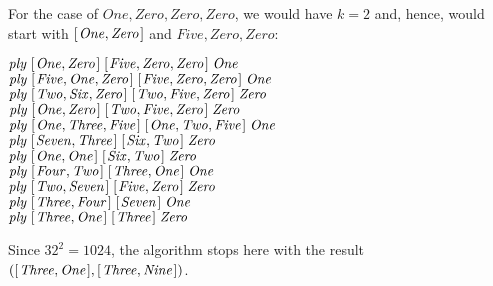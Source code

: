 \documentclass{scrreprt}
\newcommand{\Conid}[1]{\mathit{#1}}
\newcommand{\Varid}[1]{\mathit{#1}}
\begin{document}
For the case of \ensuremath{\Conid{One},\Conid{Zero},\Conid{Zero},\Conid{Zero}},
we would have $k = 2$ and, hence, would start
with \ensuremath{[\mskip1.5mu \Conid{One},\Conid{Zero}\mskip1.5mu]} and \ensuremath{\Conid{Five},\Conid{Zero},\Conid{Zero}}:

\ensuremath{\Varid{ply}\;[\mskip1.5mu \Conid{One},\Conid{Zero}\mskip1.5mu]\;[\mskip1.5mu \Conid{Five},\Conid{Zero},\Conid{Zero}\mskip1.5mu]\;\Conid{One}}\\
\ensuremath{\Varid{ply}\;[\mskip1.5mu \Conid{Five},\Conid{One},\Conid{Zero}\mskip1.5mu]\;[\mskip1.5mu \Conid{Five},\Conid{Zero},\Conid{Zero}\mskip1.5mu]\;\Conid{One}}\\
\ensuremath{\Varid{ply}\;[\mskip1.5mu \Conid{Two},\Conid{Six},\Conid{Zero}\mskip1.5mu]\;[\mskip1.5mu \Conid{Two},\Conid{Five},\Conid{Zero}\mskip1.5mu]\;\Conid{Zero}}\\
\ensuremath{\Varid{ply}\;[\mskip1.5mu \Conid{One},\Conid{Zero}\mskip1.5mu]\;[\mskip1.5mu \Conid{Two},\Conid{Five},\Conid{Zero}\mskip1.5mu]\;\Conid{Zero}}\\
\ensuremath{\Varid{ply}\;[\mskip1.5mu \Conid{One},\Conid{Three},\Conid{Five}\mskip1.5mu]\;[\mskip1.5mu \Conid{One},\Conid{Two},\Conid{Five}\mskip1.5mu]\;\Conid{One}}\\
\ensuremath{\Varid{ply}\;[\mskip1.5mu \Conid{Seven},\Conid{Three}\mskip1.5mu]\;[\mskip1.5mu \Conid{Six},\Conid{Two}\mskip1.5mu]\;\Conid{Zero}}\\
\ensuremath{\Varid{ply}\;[\mskip1.5mu \Conid{One},\Conid{One}\mskip1.5mu]\;[\mskip1.5mu \Conid{Six},\Conid{Two}\mskip1.5mu]\;\Conid{Zero}}\\
\ensuremath{\Varid{ply}\;[\mskip1.5mu \Conid{Four},\Conid{Two}\mskip1.5mu]\;[\mskip1.5mu \Conid{Three},\Conid{One}\mskip1.5mu]\;\Conid{One}}\\
\ensuremath{\Varid{ply}\;[\mskip1.5mu \Conid{Two},\Conid{Seven}\mskip1.5mu]\;[\mskip1.5mu \Conid{Five},\Conid{Zero}\mskip1.5mu]\;\Conid{Zero}}\\
\ensuremath{\Varid{ply}\;[\mskip1.5mu \Conid{Three},\Conid{Four}\mskip1.5mu]\;[\mskip1.5mu \Conid{Seven}\mskip1.5mu]\;\Conid{One}}\\
\ensuremath{\Varid{ply}\;[\mskip1.5mu \Conid{Three},\Conid{One}\mskip1.5mu]\;[\mskip1.5mu \Conid{Three}\mskip1.5mu]\;\Conid{Zero}}

Since $32^2 = 1024$, the algorithm stops
here with the result \ensuremath{([\mskip1.5mu \Conid{Three},\Conid{One}\mskip1.5mu],[\mskip1.5mu \Conid{Three},\Conid{Nine}\mskip1.5mu])}.
\end{document}
